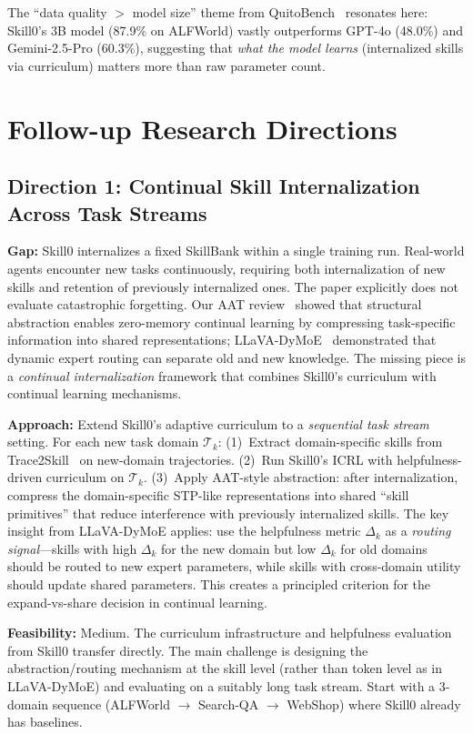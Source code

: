 \documentclass[11pt]{article}
\begin{document}
The ``data quality $>$ model size'' theme from QuitoBench~\cite{quitobench} resonates here: Skill0's 3B model (87.9\% on ALFWorld) vastly outperforms GPT-4o (48.0\%) and Gemini-2.5-Pro (60.3\%), suggesting that \textit{what the model learns} (internalized skills via curriculum) matters more than raw parameter count.

\section{Follow-up Research Directions}

\subsection{Direction 1: Continual Skill Internalization Across Task Streams}

\textbf{Gap:} Skill0 internalizes a fixed SkillBank within a single training run. Real-world agents encounter new tasks continuously, requiring both internalization of new skills and retention of previously internalized ones. The paper explicitly does not evaluate catastrophic forgetting. Our AAT review~\cite{aat} showed that structural abstraction enables zero-memory continual learning by compressing task-specific information into shared representations; LLaVA-DyMoE~\cite{dymoe} demonstrated that dynamic expert routing can separate old and new knowledge. The missing piece is a \textit{continual internalization} framework that combines Skill0's curriculum with continual learning mechanisms.

\textbf{Approach:} Extend Skill0's adaptive curriculum to a \textit{sequential task stream} setting. For each new task domain $\mathcal{T}_k$: (1)~Extract domain-specific skills from Trace2Skill~\cite{trace2skill} on new-domain trajectories. (2)~Run Skill0's ICRL with helpfulness-driven curriculum on $\mathcal{T}_k$. (3)~Apply AAT-style abstraction: after internalization, compress the domain-specific STP-like representations into shared ``skill primitives'' that reduce interference with previously internalized skills. The key insight from LLaVA-DyMoE applies: use the helpfulness metric $\Delta_k$ as a \textit{routing signal}---skills with high $\Delta_k$ for the new domain but low $\Delta_k$ for old domains should be routed to new expert parameters, while skills with cross-domain utility should update shared parameters. This creates a principled criterion for the expand-vs-share decision in continual learning.

\textbf{Feasibility:} Medium. The curriculum infrastructure and helpfulness evaluation from Skill0 transfer directly. The main challenge is designing the abstraction/routing mechanism at the skill level (rather than token level as in LLaVA-DyMoE) and evaluating on a suitably long task stream. Start with a 3-domain sequence (ALFWorld $\to$ Search-QA $\to$ WebShop) where Skill0 already has baselines.
\end{document}
